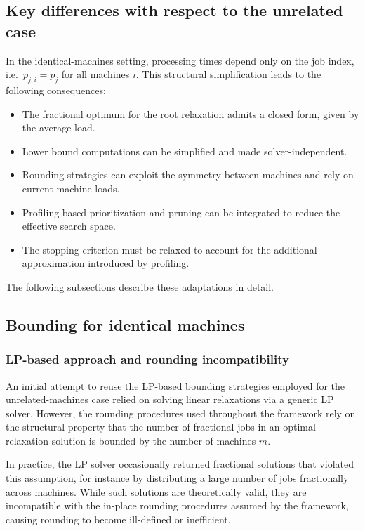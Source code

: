 \subsection{Key differences with respect to the unrelated case}

In the identical-machines setting, processing times depend only on the job index, i.e.\
\(p_{j,i} = p_j\) for all machines \(i\).
This structural simplification leads to the following consequences:

\begin{itemize}
  \item The fractional optimum for the root relaxation admits a closed form, given by the average load.
  \item Lower bound computations can be simplified and made solver-independent.
  \item Rounding strategies can exploit the symmetry between machines and rely on current machine loads.
  \item Profiling-based prioritization and pruning can be integrated to reduce the effective search space.
  \item The stopping criterion must be relaxed to account for the additional approximation introduced by profiling.
\end{itemize}

The following subsections describe these adaptations in detail.

\subsection{Bounding for identical machines}
\label{subsec:identical-bounds}

\subsubsection{LP-based approach and rounding incompatibility}

An initial attempt to reuse the LP-based bounding strategies employed for the unrelated-machines case relied on solving linear relaxations via a generic LP solver.
However, the rounding procedures used throughout the framework rely on the structural property that the number of fractional jobs in an optimal relaxation solution is bounded by the number of machines \(m\).

In practice, the LP solver occasionally returned fractional solutions that violated this assumption, for instance by distributing a large number of jobs fractionally across machines.
While such solutions are theoretically valid, they are incompatible with the in-place rounding procedures assumed by the framework, causing rounding to become ill-defined or inefficient.

